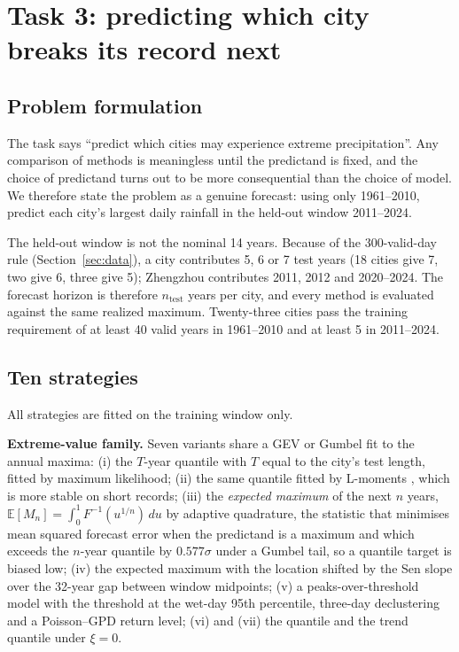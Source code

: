 \section{Task 3: predicting which city breaks its record next}\label{sec:q3}

\subsection{Problem formulation}

The task says ``predict which cities may experience extreme precipitation''. Any comparison of methods is meaningless until the predictand is fixed, and the choice of predictand turns out to be more consequential than the choice of model. We therefore state the problem as a genuine forecast: using only 1961--2010, predict each city's largest daily rainfall in the held-out window 2011--2024.

The held-out window is not the nominal 14 years. Because of the 300-valid-day rule (Section~\ref{sec:data}), a city contributes 5, 6 or 7 test years (18 cities give 7, two give 6, three give 5); Zhengzhou contributes 2011, 2012 and 2020--2024. The forecast horizon is therefore $n_{\text{test}}$ years per city, and every method is evaluated against the same realized maximum. Twenty-three cities pass the training requirement of at least 40 valid years in 1961--2010 and at least 5 in 2011--2024.

\subsection{Ten strategies}

All strategies are fitted on the training window only.

\textbf{Extreme-value family.} Seven variants share a GEV \cite{coles2001} or Gumbel fit to the annual maxima: (i) the $T$-year quantile with $T$ equal to the city's test length, fitted by maximum likelihood; (ii) the same quantile fitted by L-moments \cite{hosking1985}, which is more stable on short records; (iii) the \emph{expected maximum} of the next $n$ years, $\mathbb{E}[M_n]=\int_0^1 F^{-1}(u^{1/n})\,du$ by adaptive quadrature, the statistic that minimises mean squared forecast error when the predictand is a maximum and which exceeds the $n$-year quantile by $0.577\sigma$ under a Gumbel tail, so a quantile target is biased low; (iv) the expected maximum with the location shifted by the Sen slope over the 32-year gap between window midpoints; (v) a peaks-over-threshold model with the threshold at the wet-day 95th percentile, three-day declustering and a Poisson--GPD return level; (vi) and (vii) the quantile and the trend quantile under $\xi=0$.

